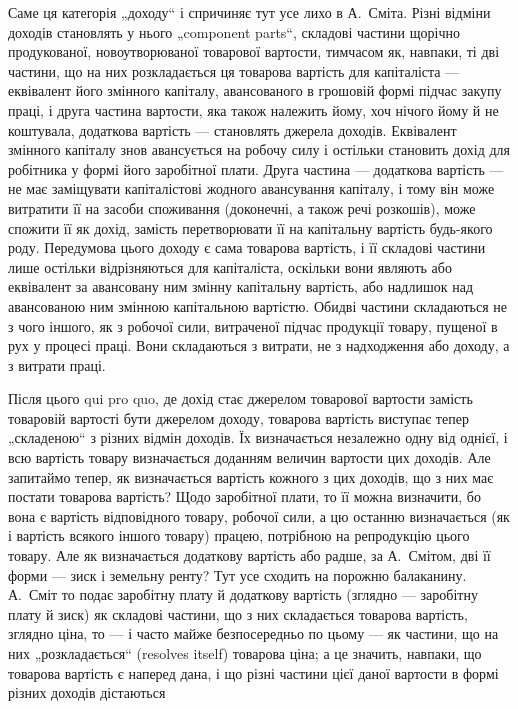 Саме ця категорія „доходу“ і спричиняє тут усе лихо в А.~Сміта.
Різні відміни доходів становлять у нього „component parts“, складові
частини щорічно продукованої, новоутворюваної товарової вартости, тимчасом
як, навпаки, ті дві частини, що на них розкладається ця товарова
вартість для капіталіста — еквівалент його змінного капіталу, авансованого
в грошовій формі підчас закупу праці, і друга частина вартости, яка також
належить йому, хоч нічого йому й не коштувала, додаткова вартість —
становлять джерела доходів. Еквівалент змінного капіталу знов авансується
на робочу силу і остільки становить дохід для робітника у формі його
заробітної плати. Друга частина — додаткова вартість — не має заміщувати
капіталістові жодного авансування капіталу, і тому він може витратити її
на засоби споживання (доконечні, а також речі розкошів), може спожити її
як дохід, замість перетворювати її на капітальну вартість будь-якого роду.
Передумова цього доходу є сама товарова вартість, і її складові частини
лише остільки відрізняються для капіталіста, оскільки вони являють або
еквівалент за авансовану ним змінну капітальну вартість, або надлишок
над авансованою ним змінною капітальною вартістю. Обидві частини складаються
не з чого іншого, як з робочої сили, витраченої підчас продукції
товару, пущеної в рух у процесі праці. Вони складаються з витрати,
не з надходження або доходу, а з витрати праці.

Після цього qui pro quo, де дохід стає джерелом товарової вартости
замість товаровій вартості бути джерелом доходу, товарова
вартість виступає тепер „складеною“ з різних відмін доходів. Їх
визначається незалежно одну від однієї, і всю вартість товару визначається
доданням величин вартости цих доходів. Але запитаймо тепер,
як визначається вартість кожного з цих доходів, що з них має постати
товарова вартість? Щодо заробітної плати, то її можна визначити, бо вона
є вартість відповідного товару, робочої сили, а цю останню визначається
(як і вартість всякого іншого товару) працею, потрібною на репродукцію
цього товару. Але як визначається додаткову вартість або радше, за А.~Смітом, дві її форми — зиск і земельну ренту? Тут усе сходить на порожню
балаканину. А.~Сміт то подає заробітну плату й додаткову вартість
(зглядно — заробітну плату й зиск) як складові частини, що з них складається
товарова вартість, зглядно ціна, то — і часто майже безпосередньо
по цьому — як частини, що на них „розкладається“ (resolves itself) товарова
ціна; а це значить, навпаки, що товарова вартість є наперед дана,
і що різні частини цієї даної вартости в формі різних доходів дістаються
\parbreak{}  %
